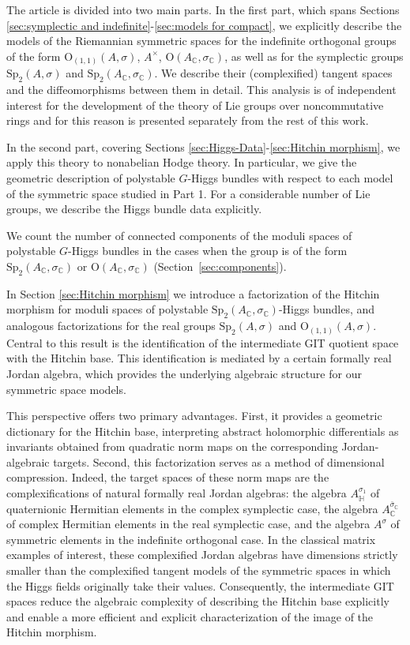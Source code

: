 \documentclass[oneside,11pt]{amsart}
\theoremstyle{definition}
\theoremstyle{remark}
\numberwithin{thm}{section}
\numberwithin{equation}{section}
\begin{document}
The article is divided into two main parts. In the first part, which spans Sections \ref{sec:symplectic and indefinite}-\ref{sec:models for compact}, we explicitly describe the models of the Riemannian symmetric spaces for the indefinite orthogonal groups of the form $\mathrm{O}_{(1,1)}(A, \sigma)$, $A^{\times}$, $\mathrm{O}(A_{\mathbb{C}}, \sigma_{\mathbb{C}})$, as well as for the symplectic groups $\mathrm{Sp}_{2}(A, \sigma)$ and $\mathrm{Sp}_{2}(A_{\mathbb{C}}, \sigma_{\mathbb{C}})$. We describe their (complexified) tangent spaces and the diffeomorphisms between them in detail. This analysis is of independent interest for the development of the theory of Lie groups over noncommutative rings and for this reason is presented separately from the rest of this work. 

In the second part, covering Sections \ref{sec:Higgs-Data}-\ref{sec:Hitchin morphism},
 we apply this theory to nonabelian Hodge theory. In particular, we give the geometric description  of polystable $G$-Higgs bundles  with respect to each model of the symmetric space studied in Part 1. For a considerable number of Lie groups, we describe the Higgs bundle data explicitly. 
 
 We count the number of connected components of the moduli spaces of polystable $G$-Higgs bundles in the cases when the group is of the form $\mathrm{Sp}_2(A_{\mathbb{C}}, \sigma_{\mathbb{C}})$ or $\mathrm{O}(A_{\mathbb{C}}, \sigma_{\mathbb{C}})$ (Section~\ref{sec:components}).  
 
In Section \ref{sec:Hitchin morphism} we introduce a factorization of the Hitchin morphism for moduli spaces of polystable
$\mathrm{Sp}_2(A_{\mathbb C},\sigma_{\mathbb C})$-Higgs bundles, and analogous factorizations for the real groups $\mathrm{Sp}_2(A,\sigma)$ and $\mathrm{O}_{(1,1)}(A,\sigma)$. Central to this result is the identification of the intermediate GIT quotient space with the Hitchin base. This identification is mediated by a certain formally real Jordan algebra, which provides the underlying algebraic structure for our symmetric space models. 

This perspective offers two primary advantages. First, it provides a geometric dictionary for the Hitchin base, interpreting abstract holomorphic differentials as invariants obtained from quadratic norm maps on the corresponding Jordan-algebraic targets. Second, this factorization serves as a method of dimensional compression. Indeed, the target spaces of these norm maps are the complexifications of natural formally real Jordan algebras: the algebra $A_{\mathbb H}^{\sigma_1}$ of quaternionic Hermitian elements in the complex symplectic case, the algebra $A_{\mathbb C}^{\bar\sigma_{\mathbb C}}$ of complex Hermitian elements in the real symplectic case, and the algebra $A^\sigma$ of symmetric elements in the indefinite
orthogonal case. In the classical matrix examples of interest, these complexified Jordan algebras have dimensions strictly smaller than 
the complexified tangent models of the symmetric spaces in which
the Higgs fields originally take their values. Consequently, the intermediate GIT spaces reduce the algebraic complexity of describing the Hitchin base explicitly and enable a more efficient and explicit characterization of the image of the
Hitchin morphism.
\end{document}
